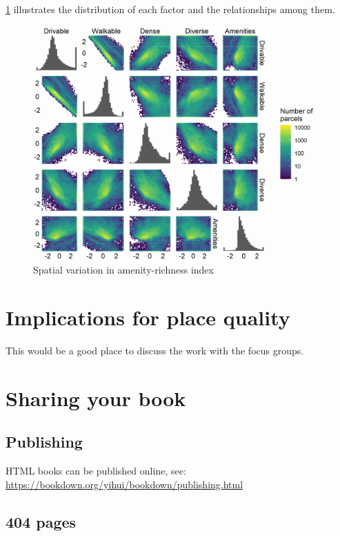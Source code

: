 \documentclass[
]{book}
\begin{document}
\ref{fig:factor-cor} illustrates the distribution of each factor and the
relationships among them.

\begin{figure}
\includegraphics[width=1\linewidth]{04_figures/factor-cor} \caption{Spatial variation in amenity-richness index}\label{fig:factor-cor}
\end{figure}

\hypertarget{implications-for-place-quality}{%
\chapter{Implications for place quality}\label{implications-for-place-quality}}

This would be a good place to discuss the work
with the focus groups.

\hypertarget{sharing-your-book}{%
\chapter{Sharing your book}\label{sharing-your-book}}

\hypertarget{publishing}{%
\section{Publishing}\label{publishing}}

HTML books can be published online, see: \url{https://bookdown.org/yihui/bookdown/publishing.html}

\hypertarget{pages}{%
\section{404 pages}\label{pages}}
\end{document}
